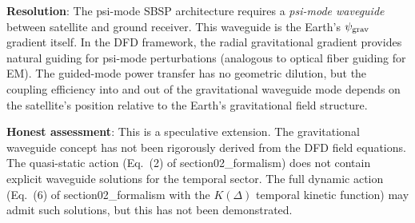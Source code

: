 \documentclass[11pt]{article}
\newcommand{\psigrav}{\psi_{\rm grav}}
\begin{document}
\textbf{Resolution}: The psi-mode SBSP architecture requires a
\emph{psi-mode waveguide} between satellite and ground receiver. This
waveguide is the Earth's $\psigrav$ gradient itself. In the DFD framework,
the radial gravitational gradient provides natural guiding for psi-mode
perturbations (analogous to optical fiber guiding for EM). The guided-mode
power transfer has no geometric dilution, but the coupling efficiency into
and out of the gravitational waveguide mode depends on the satellite's
position relative to the Earth's gravitational field structure.

\textbf{Honest assessment}: This is a speculative extension. The gravitational
waveguide concept has not been rigorously derived from the DFD field equations.
The quasi-static action (Eq.~(2) of section02\_formalism) does not contain
explicit waveguide solutions for the temporal sector. The full dynamic action
(Eq.~(6) of section02\_formalism with the $K(\Delta)$ temporal kinetic
function) may admit such solutions, but this has not been demonstrated.
\end{document}
